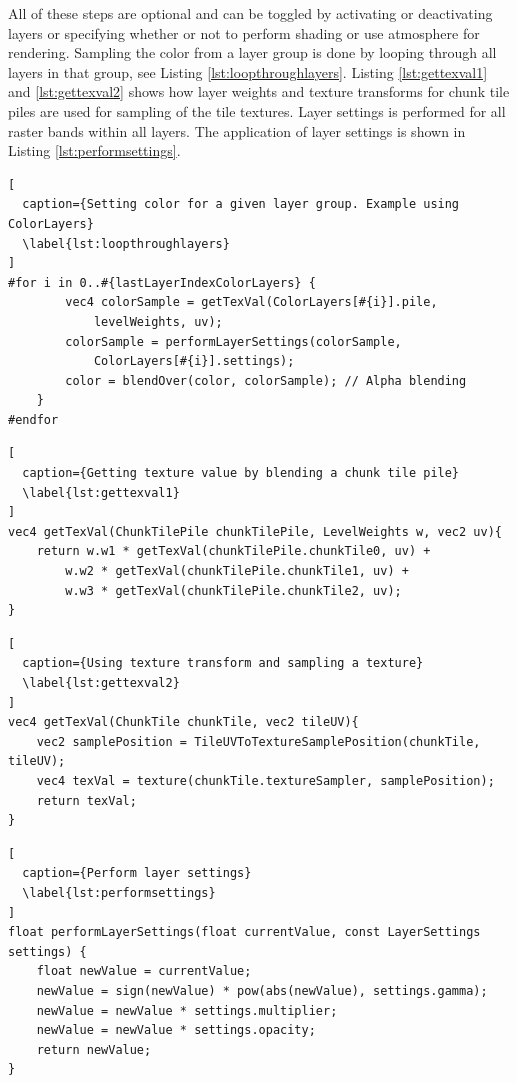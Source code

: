 All of these steps are optional and can be toggled by activating or deactivating layers or specifying whether or not to perform shading or use atmosphere for rendering. Sampling the color from a layer group is done by looping through all layers in that group, see Listing \ref{lst:loopthroughlayers}. Listing \ref{lst:gettexval1} and \ref{lst:gettexval2} shows how layer weights and texture transforms for chunk tile piles are used for sampling of the tile textures. Layer settings is performed for all raster bands within all layers. The application of layer settings is shown in Listing \ref{lst:performsettings}.

\begin{lstlisting}[
  caption={Setting color for a given layer group. Example using ColorLayers} 
  \label{lst:loopthroughlayers}
]
#for i in 0..#{lastLayerIndexColorLayers} {
		vec4 colorSample = getTexVal(ColorLayers[#{i}].pile,
			levelWeights, uv);
		colorSample = performLayerSettings(colorSample,
			ColorLayers[#{i}].settings);
		color = blendOver(color, colorSample); // Alpha blending
	}
#endfor
\end{lstlisting}

\begin{lstlisting}[
  caption={Getting texture value by blending a chunk tile pile} 
  \label{lst:gettexval1}
]
vec4 getTexVal(ChunkTilePile chunkTilePile, LevelWeights w, vec2 uv){
	return w.w1 * getTexVal(chunkTilePile.chunkTile0, uv) + 
		w.w2 * getTexVal(chunkTilePile.chunkTile1, uv) + 
		w.w3 * getTexVal(chunkTilePile.chunkTile2, uv);
}
\end{lstlisting}

\begin{lstlisting}[
  caption={Using texture transform and sampling a texture} 
  \label{lst:gettexval2}
]
vec4 getTexVal(ChunkTile chunkTile, vec2 tileUV){
	vec2 samplePosition = TileUVToTextureSamplePosition(chunkTile, tileUV);
	vec4 texVal = texture(chunkTile.textureSampler, samplePosition);
	return texVal;
}
\end{lstlisting}


\begin{lstlisting}[
  caption={Perform layer settings} 
  \label{lst:performsettings}
]
float performLayerSettings(float currentValue, const LayerSettings settings) {
	float newValue = currentValue;
	newValue = sign(newValue) * pow(abs(newValue), settings.gamma);
	newValue = newValue * settings.multiplier;
	newValue = newValue * settings.opacity;
	return newValue;
}
\end{lstlisting}

